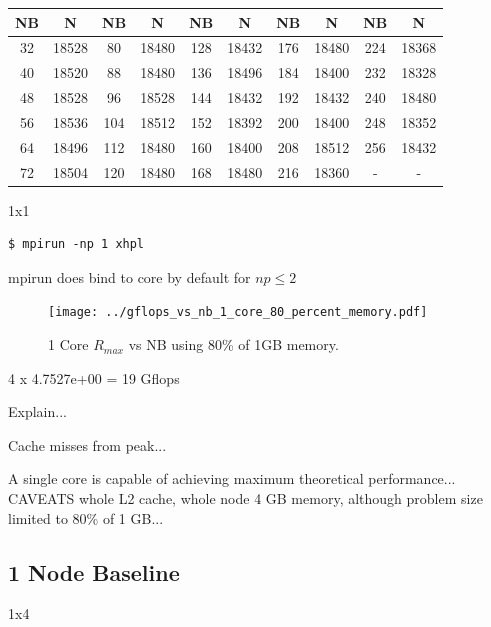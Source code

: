 \documentclass{article}
\begin{document}
\begin{center}
	\begin{tabular}{ |c|c|c|c|c|c|c|c|c|c| } 
		\hline
		NB & N & NB & N & NB & N & NB & N & NB & N \\ 
		\hline
		32 & 18528 &  80 & 18480 & 128 & 18432 & 176 & 18480 & 224 & 18368 \\ 
		40 & 18520 &  88 & 18480 & 136 & 18496 & 184 & 18400 & 232 & 18328 \\ 
 		48 & 18528 &  96 & 18528 & 144 & 18432 & 192 & 18432 & 240 & 18480 \\
		56 & 18536 & 104 & 18512 & 152 & 18392 & 200 & 18400 & 248 & 18352 \\ 
 		64 & 18496 & 112 & 18480 & 160 & 18400 & 208 & 18512 & 256 & 18432 \\
		72 & 18504 & 120 & 18480 & 168 & 18480 & 216 & 18360 &   - &     - \\ 
 		\hline
	\end{tabular}
\end{center}

1x1

\lstset{style=termstyle}
\begin{lstlisting}[]
$ mpirun -np 1 xhpl
\end{lstlisting}

mpirun does bind to core by default for $np \leq 2$

\begin{figure}
	\centering	
	\texttt{[image: ../gflops\_vs\_nb\_1\_core\_80\_percent\_memory.pdf]}
	\caption{1 Core $R_{max}$ vs NB using 80\% of 1GB memory.}
\end{figure}

4 x 4.7527e+00 = 19 Gflops

Explain...

Cache misses from peak...

A single core is capable of achieving maximum theoretical performance... CAVEATS whole L2 cache, whole node 4 GB memory, although problem size limited to 80\% of 1 GB...  


\subsection{1 Node Baseline}

1x4
\end{document}

